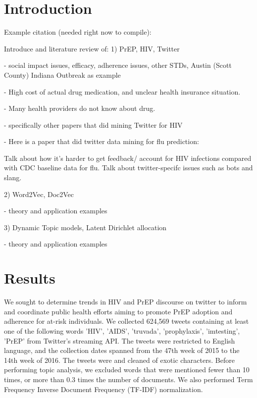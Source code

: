 \documentclass{sig-alternate-05-2015}
\begin{document}
%
%
\begin{CCSXML}

\end{CCSXML}


%
%

%
%
\printccsdesc



\section{Introduction}
Example citation (needed right now to compile):

Introduce and literature review of:
1) PrEP, HIV, Twitter

 - social impact issues, efficacy, adherence issues, other STDs, Austin (Scott County) Indiana Outbreak as example
 
 - High cost of actual drug medication, and unclear health insurance situation.
 
 - Many health providers do not know about drug.
 
 - specifically other papers that did mining Twitter for HIV
 
 - Here is a paper that did twitter data mining for flu prediction:
 
 
 Talk about how it's harder to get feedback/ account for HIV infections compared with CDC baseline data for flu. Talk about twitter-specifc issues such as bots and slang.


2) Word2Vec, Doc2Vec

 - theory and application examples

3) Dynamic Topic models, Latent Dirichlet allocation

- theory and application examples

\section{Results}



We sought to determine trends in HIV and PrEP discourse on twitter to inform and coordinate public health efforts aiming to promote PrEP adoption and adherence for at-risk individuals. We collected 624,569 tweets containing at least one of the following words 'HIV', 'AIDS', 'truvada', 'prophylaxis', 'imtesting', 'PrEP' from Twitter's streaming API. The tweets were restricted to English language, and the collection dates spanned from the 47th week of 2015 to the 14th week of 2016. The tweets were and cleaned of exotic characters. Before performing topic analysis, we excluded words that were mentioned fewer than 10 times, or more than 0.3 times the number of documents. We also performed Term Frequency Inverse Document Frequency (TF-IDF) normalization.
\end{document}
